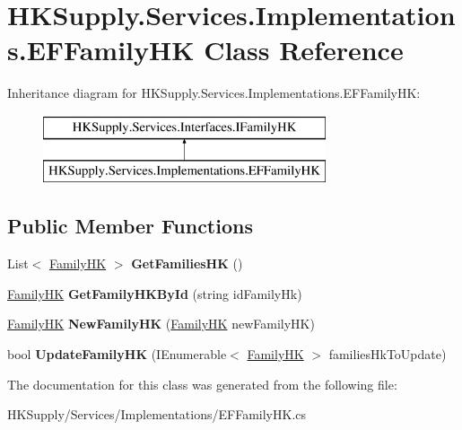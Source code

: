 \hypertarget{class_h_k_supply_1_1_services_1_1_implementations_1_1_e_f_family_h_k}{}\section{H\+K\+Supply.\+Services.\+Implementations.\+E\+F\+Family\+HK Class Reference}
\label{class_h_k_supply_1_1_services_1_1_implementations_1_1_e_f_family_h_k}
Inheritance diagram for H\+K\+Supply.\+Services.\+Implementations.\+E\+F\+Family\+HK\+:\begin{figure}[H]
\begin{center}
\leavevmode
\includegraphics[height=2.000000cm]{class_h_k_supply_1_1_services_1_1_implementations_1_1_e_f_family_h_k}
\end{center}
\end{figure}
\subsection*{Public Member Functions}
\begin{DoxyCompactItemize}
\item 
\mbox{\label{class_h_k_supply_1_1_services_1_1_implementations_1_1_e_f_family_h_k_ae26fb30b964c5992716e773398d078c7}} 
List$<$ \mbox{\hyperlink{class_h_k_supply_1_1_models_1_1_family_h_k}{Family\+HK}} $>$ {\bfseries Get\+Families\+HK} ()
\item 
\mbox{\label{class_h_k_supply_1_1_services_1_1_implementations_1_1_e_f_family_h_k_a78c6a98aec512c5437cd99fa7187e952}} 
\mbox{\hyperlink{class_h_k_supply_1_1_models_1_1_family_h_k}{Family\+HK}} {\bfseries Get\+Family\+H\+K\+By\+Id} (string id\+Family\+Hk)
\item 
\mbox{\label{class_h_k_supply_1_1_services_1_1_implementations_1_1_e_f_family_h_k_a834b50dbc8cdb8b5b47f1a1cea9951a7}} 
\mbox{\hyperlink{class_h_k_supply_1_1_models_1_1_family_h_k}{Family\+HK}} {\bfseries New\+Family\+HK} (\mbox{\hyperlink{class_h_k_supply_1_1_models_1_1_family_h_k}{Family\+HK}} new\+Family\+HK)
\item 
\mbox{\label{class_h_k_supply_1_1_services_1_1_implementations_1_1_e_f_family_h_k_a59ea7dd852c489352c6d5e0289fea7d7}} 
bool {\bfseries Update\+Family\+HK} (I\+Enumerable$<$ \mbox{\hyperlink{class_h_k_supply_1_1_models_1_1_family_h_k}{Family\+HK}} $>$ families\+Hk\+To\+Update)
\end{DoxyCompactItemize}


The documentation for this class was generated from the following file\+:\begin{DoxyCompactItemize}
\item 
H\+K\+Supply/\+Services/\+Implementations/E\+F\+Family\+H\+K.\+cs\end{DoxyCompactItemize}
